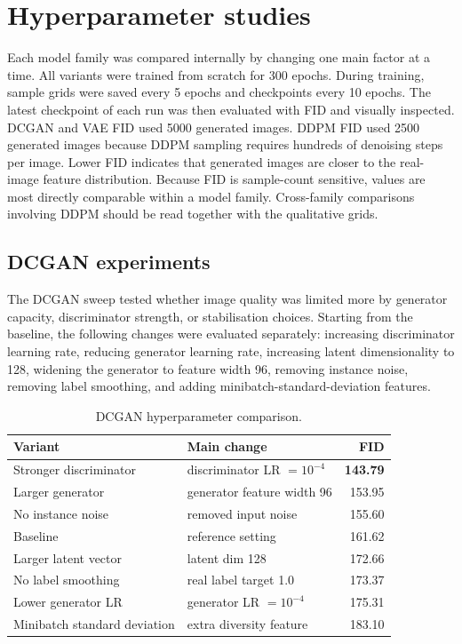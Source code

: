 \documentclass[11pt,a4paper]{article}
\begin{document}
\section{Hyperparameter studies}

Each model family was compared internally by changing one main factor at a time.
All variants were trained from scratch for 300 epochs.
During training, sample grids were saved every 5 epochs and checkpoints every 10 epochs.
The latest checkpoint of each run was then evaluated with FID and visually inspected.
DCGAN and VAE FID used 5000 generated images.
DDPM FID used 2500 generated images because DDPM sampling requires hundreds of denoising steps per image.
Lower FID indicates that generated images are closer to the real-image feature distribution.
Because FID is sample-count sensitive, values are most directly comparable within a model family.
Cross-family comparisons involving DDPM should be read together with the qualitative grids.

\subsection{DCGAN experiments}

The DCGAN sweep tested whether image quality was limited more by generator capacity, discriminator strength, or stabilisation choices.
Starting from the baseline, the following changes were evaluated separately: increasing discriminator learning rate, reducing generator learning rate, increasing latent dimensionality to 128, widening the generator to feature width 96, removing instance noise, removing label smoothing, and adding minibatch-standard-deviation features.
\begin{table}[H]
\centering
\caption{DCGAN hyperparameter comparison.}
\label{tab:dcgan-hparam}
\begin{tabular}{llr}
\toprule
Variant & Main change & FID \\
\midrule
Stronger discriminator & discriminator LR $=10^{-4}$ & \textbf{143.79} \\
Larger generator & generator feature width 96 & 153.95 \\
No instance noise & removed input noise & 155.60 \\
Baseline & reference setting & 161.62 \\
Larger latent vector & latent dim 128 & 172.66 \\
No label smoothing & real label target 1.0 & 173.37 \\
Lower generator LR & generator LR $=10^{-4}$ & 175.31 \\
Minibatch standard deviation & extra diversity feature & 183.10 \\
\bottomrule
\end{tabular}
\end{table}
\end{document}
